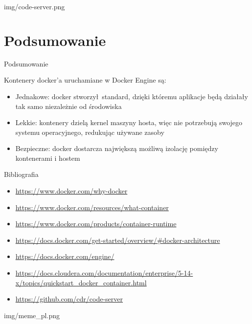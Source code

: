 \documentclass[aspectratio=169]{beamer}
\begin{document}
\begin{frameImg}{img/code-server.png}
\end{frameImg}

\section{Podsumowanie}
\begin{frame}{Podsumowanie}
    \begin{card}
        Kontenery docker'a uruchamiane w Docker Engine są:
        \begin{itemize}
            \item Jednakowe: docker stworzył standard, dzięki któremu aplikacje będą działały tak samo niezależnie od środowiska
            \item Lekkie: kontenery dzielą kernel maszyny hosta, więc nie potrzebują swojego systemu operacyjnego, redukując używane zasoby
            \item Bezpieczne: docker dostarcza największą możliwą izolację pomiędzy kontenerami i hostem
        \end{itemize}
    \end{card}
\end{frame}


\begin{frame}{Bibliografia}
    \begin{card}
        \begin{itemize}
            \item \url{https://www.docker.com/why-docker}
            \item \url{https://www.docker.com/resources/what-container}
            \item \url{https://www.docker.com/products/container-runtime}
            \item \url{https://docs.docker.com/get-started/overview/#docker-architecture}
            \item \url{https://docs.docker.com/engine/}
            \item \url{https://docs.cloudera.com/documentation/enterprise/5-14-x/topics/quickstart_docker_container.html}
            \item \url{https://github.com/cdr/code-server}
        \end{itemize}
    \end{card}
\end{frame}

\begin{frameImg}{img/meme_pl.png}
\end{frameImg}
\end{document}
